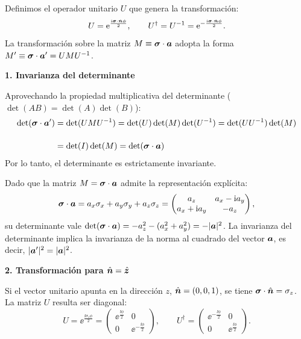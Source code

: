 \begin{resolucion}
Definimos el operador unitario $U$ que genera la transformación:
\[
U = \mathrm{e}^{\frac{\mathrm{i} \bm{\sigma} \cdot \hat{\bm{n}} \phi}{2}}, \qquad U^\dagger = U^{-1} = \mathrm{e}^{-\frac{\mathrm{i} \bm{\sigma} \cdot \hat{\bm{n}} \phi}{2}}.
\]
La transformación sobre la matriz $M \equiv \bm{\sigma} \cdot \bm{a}$ adopta la forma $M' \equiv \bm{\sigma} \cdot \bm{a}' = U M U^{-1}$.

\textbf{1. Invarianza del determinante}

Aprovechando la propiedad multiplicativa del determinante ($\det(AB) = \det(A)\det(B)$):
\begin{align*}
    \det(\bm{\sigma} \cdot \bm{a}') & = \det(U M U^{-1}) = \det(U) \det(M) \det(U^{-1}) = \det(U U^{-1}) \det(M) \\[12pt]
    & = \det(I) \det(M) = \det(\bm{\sigma} \cdot \bm{a})
\end{align*}
Por lo tanto, el determinante es estrictamente invariante.

Dado que la matriz $M = \bm{\sigma} \cdot \bm{a}$ admite la representación explícita:
\[
\bm{\sigma} \cdot \bm{a} = a_x \sigma_x + a_y \sigma_y + a_z \sigma_z = \begin{pmatrix} a_z & a_x - \mathrm{i} a_y \\ a_x + \mathrm{i} a_y & -a_z \end{pmatrix},
\]
su determinante vale $\det(\bm{\sigma} \cdot \bm{a}) = -a_z^2 - (a_x^2 + a_y^2) = -\lvert\bm{a}\rvert^2$. La invarianza del determinante implica la invarianza de la norma al cuadrado del vector $\bm{a}$, es decir, $\lvert\bm{a}'\rvert^2 = \lvert\bm{a}\rvert^2$.

\textbf{2. Transformación para $\hat{\bm{n}} = \hat{\bm{z}}$}

Si el vector unitario apunta en la dirección $z$, $\hat{\bm{n}} = (0,0,1)$, se tiene $\bm{\sigma} \cdot \hat{\bm{n}} = \sigma_z$. La matriz $U$ resulta ser diagonal:
\[
U = \ee^{\frac{\ii \sigma_z \phi}{2}} = \begin{pmatrix} \ee^{\frac{\ii\phi}{2}} & 0 \\ 0 & \ee^{-\frac{\ii\phi}{2}} \end{pmatrix}, \qquad U^\dagger = \begin{pmatrix} \ee^{-\frac{\ii\phi}{2}} & 0 \\ 0 & \ee^{\frac{\ii\phi}{2}} \end{pmatrix}.
\]


\end{resolucion}
